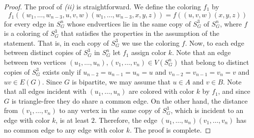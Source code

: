 \documentclass{article}
\begin{document}
\begin{proof}
The proof of {\it (ii)} is straightforward. We define the coloring $f_1$ by 
$$f_1((w_1,\ldots,w_{n-3},u,v,w)(w_1,\ldots,w_{n-3},x,y,z))=f((u,v,w)(x,y,z))$$ for every edge in $S_G^n$ whose endvertices lie in the same copy of $S_G^3$ of $S_G^n$, where $f$ is a coloring of $S_G^3$ that satisfies the properties in the assumption of the statement. That is, in each copy of $S_G^3$ we use the coloring $f$. Now, to each edge between distinct copies of $S_G^3$ in $S_G^n$ let $f_1$ assign color $k$. Note that an edge between two vertices $(u_1,\ldots, u_n),(v_1,\ldots,v_n)\in V(S_G^n)$ that belong to distinct copies of $S_G^3$ exists only if $u_{n-2}=u_{n-1}=u_{n}=u$ and $v_{n-2}=v_{n-1}=v_{n}=v$ and $uv\in E(G)$. Since $G$ is bipartite, we may assume that $u\in A$ and $v\in B$. Note that all edges incident with $(u_1,\ldots, u_n)$ are colored with color $k$ by $f_1$, and since $G$ is triangle-free they do share a common edge. On the other hand, the distance from $(v_1,\ldots,v_n)$ to any vertex in the same copy of $S_G^3$, which is incident to an edge with color $k$, is at least $2$. Therefore, the edge $(u_1,\ldots, u_n)(v_1,\ldots,v_n)$ has no common edge to any edge with color $k$. 
The proof is complete.  
\end{proof}	
\end{document}
